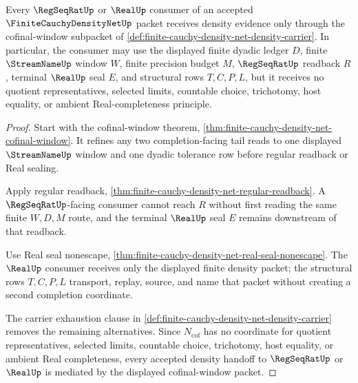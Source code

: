 \begin{theorem}
\label{thm:finite-cauchy-density-net-regseqrat-density-handoff}
Every $\RegSeqRatUp$ or $\RealUp$ consumer of an accepted $\FiniteCauchyDensityNetUp$ packet receives density evidence only through the cofinal-window subpacket of \autoref{def:finite-cauchy-density-net-density-carrier}. In particular, the consumer may use the displayed finite dyadic ledger $D$, finite $\StreamNameUp$ window $W$, finite precision budget $M$, $\RegSeqRatUp$ readback $R$, terminal $\RealUp$ seal $E$, and structural rows $T,C,P,L$, but it receives no quotient representatives, selected limits, countable choice, trichotomy, host equality, or ambient Real-completeness principle.
\end{theorem}
\begin{proof}
Start with the cofinal-window theorem, \autoref{thm:finite-cauchy-density-net-cofinal-window}. It refines any two completion-facing tail reads to one displayed $\StreamNameUp$ window and one dyadic tolerance row before regular readback or Real sealing.

Apply regular readback, \autoref{thm:finite-cauchy-density-net-regular-readback}. A $\RegSeqRatUp$-facing consumer cannot reach $R$ without first reading the same finite $W,D,M$ route, and the terminal $\RealUp$ seal $E$ remains downstream of that readback.

Use Real seal nonescape, \autoref{thm:finite-cauchy-density-net-real-seal-nonescape}. The $\RealUp$ consumer receives only the displayed finite density packet; the structural rows $T,C,P,L$ transport, replay, source, and name that packet without creating a second completion coordinate.

The carrier exhaustion clause in \autoref{def:finite-cauchy-density-net-density-carrier} removes the remaining alternatives. Since $N_{\mathrm{cof}}$ has no coordinate for quotient representatives, selected limits, countable choice, trichotomy, host equality, or ambient Real completeness, every accepted density handoff to $\RegSeqRatUp$ or $\RealUp$ is mediated by the displayed cofinal-window packet.
\end{proof}


